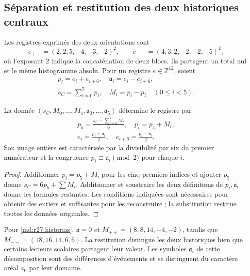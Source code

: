 \subsection{Séparation et restitution des deux historiques centraux}
Les registres exprimés des deux orientations sont
\begin{equation}
 e_{++}=(2,2,5,-4,-3,-2)^2,\qquad
 e_{--}=(4,3,2,-2,-2,-5)^2,
 \label{md:r27:historias}
\end{equation}
où l'exposant $2$ indique la concaténation de deux blocs. Ils partagent un total nul et le même histogramme absolu. Pour un registre $e\in\mathbb Z^{12}$, soient
\begin{equation}
 \begin{gathered}
 p_i=e_i+e_{i+6},\quad \mathfrak a_i=e_i-e_{i+6},\\
 s_C=\sum_{i=0}^{5}p_i,\quad M_i=p_i-p_5\quad(0\le i<5).
 \end{gathered}
 \label{md:r27:registro-electron}
\end{equation}
\begin{proposition}
La donnée $(s_C,M_0,\ldots,M_4,\mathfrak a_0,\ldots,\mathfrak a_5)$ détermine le registre par
\begin{equation}
 \begin{gathered}
 p_5=\frac{s_C-\sum_{i=0}^{4}M_i}{6},\quad p_i=p_5+M_i,\\
 e_i=\frac{p_i+\mathfrak a_i}{2},\quad e_{i+6}=\frac{p_i-\mathfrak a_i}{2}.
 \end{gathered}
 \label{md:r27:inversa-electron}
\end{equation}
Son image entière est caractérisée par la divisibilité par six du premier numérateur et la congruence $p_i\equiv \mathfrak a_i\pmod2$ pour chaque $i$.
\end{proposition}
\begin{proof}
Additionner $p_i=p_5+M_i$ pour les cinq premiers indices et ajouter $p_5$ donne $s_C=6p_5+\sum M_i$. Additionner et soustraire les deux définitions de $p_i,\mathfrak a_i$ donne les formules restantes. Les conditions indiquées sont nécessaires pour obtenir des entiers et suffisantes pour les reconstruire ; la substitution restitue toutes les données originales.
\end{proof}
Pour \eqref{md:r27:historias}, $\mathfrak a=0$ et $M_{++}=(8,8,14,-4,-2)$, tandis que $M_{--}=(18,16,14,6,6)$. La restitution distingue les deux historiques bien que certains lecteurs scalaires partagent leur valeur. Les symboles $\mathfrak a_i$ de cette décomposition sont des différences d'événements et se distinguent du caractère aréal $a_0$ par leur domaine.

